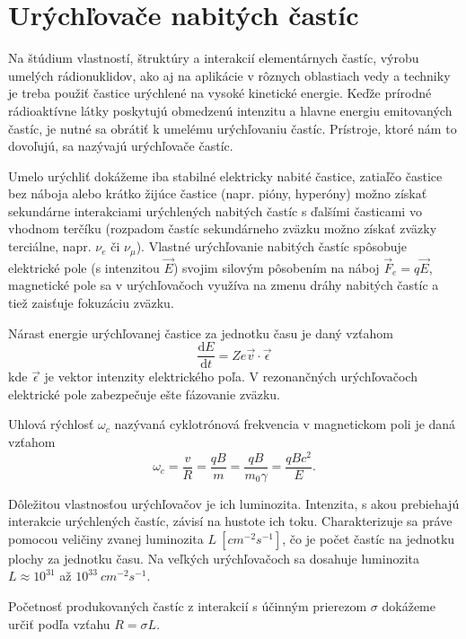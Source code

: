 \documentclass[../../main.tex]{subfiles}
\begin{document}
\chapter{Urýchľovače nabitých častíc}

Na štúdium vlastností, štruktúry a interakcií elementárnych častíc, výrobu umelých rádionuklidov, ako aj na aplikácie v rôznych oblastiach vedy a techniky je treba použiť častice urýchlené na vysoké kinetické energie. Keďže prírodné rádioaktívne látky poskytujú obmedzenú intenzitu a hlavne energiu emitovaných častíc, je nutné sa obrátiť k umelému urýchľovaniu častíc. Prístroje, ktoré nám to dovoľujú, sa nazývajú urýchľovače častíc.

Umelo urýchliť dokážeme iba stabilné elektricky nabité častice, zatiaľčo častice bez náboja alebo krátko žijúce častice (napr. pióny, hyperóny) možno získať sekundárne interakciami urýchlených nabitých častíc s ďalšími časticami vo vhodnom terčíku (rozpadom častíc sekundárneho zväzku možno získať zväzky terciálne, napr. $\nu_e$ či $\nu_\mu$). Vlastné urýchľovanie nabitých častíc spôsobuje elektrické pole (s intenzitou $\vec{E}$) svojim silovým pôsobením na náboj $\vec{F}_e=q\vec{E}$, magnetické pole sa v urýchľovačoch využíva na zmenu dráhy nabitých častíc a tiež zaisťuje fokuzáciu zväzku.

Nárast energie urýchľovanej častice za jednotku času je daný vzťahom
\begin{equation}
\dfrac{\mathrm{d}E}{\mathrm{d}t}=Ze\vec{v}\cdot\vec{\epsilon}
\end{equation}
kde $\vec{\epsilon}$ je vektor intenzity elektrického poľa. V rezonančných urýchľovačoch elektrické pole zabezpečuje ešte fázovanie zväzku.

Uhlová rýchlosť $\omega_c$ nazývaná cyklotrónová frekvencia v magnetickom poli je daná vzťahom
\begin{equation}
\omega_c=\dfrac{v}{R}=\dfrac{qB}{m}=\dfrac{qB}{m_0\gamma}=\dfrac{qBc^2}{E}.
\end{equation}

Dôležitou vlastnosťou urýchľovačov je ich luminozita. Intenzita, s akou prebiehajú interakcie urýchlených častíc, závisí na hustote ich toku. Charakterizuje sa práve pomocou veličiny zvanej luminozita $L\:\unit{[cm^{-2}s^{-1}]}$, čo je počet častíc na jednotku plochy za jednotku času. Na veľkých urýchľovačoch sa dosahuje luminozita $L\approx 10^{31}$ až $10^{33}\:\unit{cm^{-2}s^{-1}}$.

Početnosť produkovaných častíc z interakcií s účinným prierezom $\sigma$ dokážeme určiť podľa vzťahu $R=\sigma L$.
\end{document}
